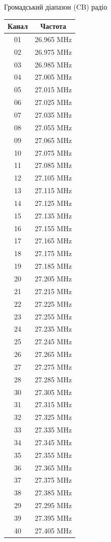 
{ \scriptsize
\centering

Громадський діапазон (CB) радіо\\
\begin{tabular}{|c|c|}\hline
Канал     & Частота \\ \hline
01 & 26.965 MHz        \\
02 & 26.975 MHz        \\
03 & 26.985 MHz        \\
04 & 27.005 MHz        \\
05 & 27.015 MHz        \\
06 & 27.025 MHz        \\
07 & 27.035 MHz        \\
08 & 27.055 MHz        \\
09 & 27.065 MHz        \\
10 & 27.075 MHz        \\
11 & 27.085 MHz        \\
12 & 27.105 MHz        \\
13 & 27.115 MHz        \\
14 & 27.125 MHz        \\
15 & 27.135 MHz        \\
16 & 27.155 MHz        \\
17 & 27.165 MHz        \\
18 & 27.175 MHz        \\
19 & 27.185 MHz        \\
20 & 27.205 MHz        \\
21 & 27.215 MHz        \\
22 & 27.225 MHz        \\
23 & 27.255 MHz        \\
24 & 27.235 MHz        \\
25 & 27.245 MHz        \\
26 & 27.265 MHz        \\
27 & 27.275 MHz        \\
28 & 27.285 MHz        \\
30 & 27.305 MHz        \\
31 & 27.315 MHz        \\
32 & 27.325 MHz        \\
33 & 27.335 MHz        \\
34 & 27.345 MHz        \\
35 & 27.355 MHz        \\
36 & 27.365 MHz        \\
37 & 27.375 MHz        \\
38 & 27.385 MHz        \\
29 & 27.295 MHz        \\
39 & 27.395 MHz        \\
40 & 27.405 MHz        \\

\hline
\end{tabular}\\

\vspace{0.05in}

}
